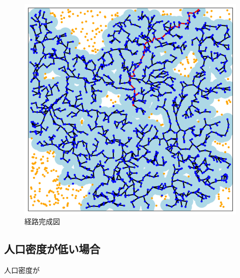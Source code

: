 \documentclass[a4paper, 11pt]{ltjsarticle}
\begin{document}
\begin{enumerate}[label=\textbf{(\arabic*)}]
        \begin{figure}[H]
          \centering
          \includegraphics[width=110mm]{4_step.png}
          \caption{経路完成図}
          \label{figure:fourth_step}
        \end{figure}
\end{enumerate}

\subsection{人口密度が低い場合}
人口密度が




\clearpage
\end{document}
